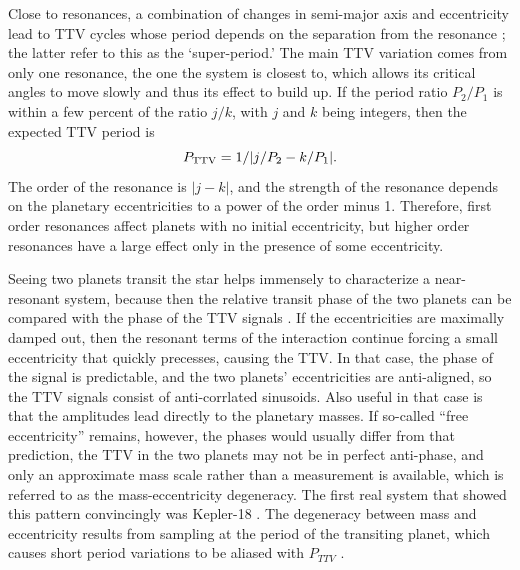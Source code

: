 \documentclass[graybox,natbib,nosecnum]{svmult}
\begin{document}
Close to resonances, a combination of changes in semi-major axis and eccentricity lead to TTV cycles whose period depends on the separation from the resonance \citep{Steffen2006,2012ApJ...761..122L}; the latter refer to this as the `super-period.'  The main TTV variation comes from only one resonance, the one the system is closest to, which allows its critical angles to move slowly and thus its effect to build up.  If the period ratio $P_2/P_1$ is within a few percent of the ratio $j/k$, with $j$ and $k$ being integers, then the expected TTV period is 
\begin{equation}
P_{\rm TTV} = 1/|j/P_2-k/P_1|. \label{eqn:pttv}
\end{equation}
The order of the resonance is $|j-k|$, and the strength of the resonance depends on the planetary eccentricities to a power of the order minus 1.  Therefore, first order resonances affect planets with no initial eccentricity, but higher order resonances have a large effect only in the presence of some eccentricity. 

Seeing two planets transit the star helps immensely to characterize a near-resonant system, because then the relative transit phase of the two planets can be compared with the phase of the TTV signals \citep{2012ApJ...761..122L}.  If the eccentricities are maximally damped out, then the resonant terms of the interaction continue forcing a small eccentricity that quickly precesses, causing the TTV.  In that case, the phase of the signal is predictable, and the two planets' eccentricities are anti-aligned, so the TTV signals consist of anti-corrlated sinusoids.  Also useful in that case is that the amplitudes lead directly to the planetary masses.  If so-called ``free eccentricity'' remains, however, the phases would usually differ from that prediction, the TTV in the two planets may not be in perfect anti-phase, and only an approximate mass scale rather than a measurement is available, which is referred to as the mass-eccentricity degeneracy.  The first real system that showed this pattern convincingly was Kepler-18 \citep{2011ApJS..197....7C}. %
The degeneracy between mass and eccentricity results from sampling at the period of the transiting planet, which causes short period variations to be aliased with $P_{TTV}$ \citep{2012ApJ...761..122L,2015ApJ...802..116D}.  
\end{document}
